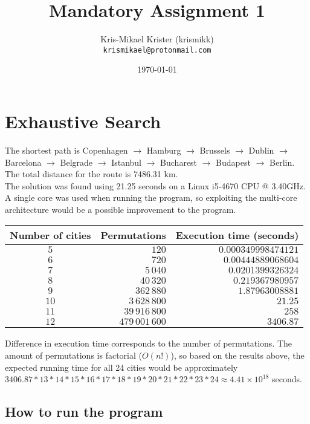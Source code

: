 \documentclass{article}
\title{Mandatory Assignment 1}
\author{Kris-Mikael Krister (krismikk)\\\texttt{krismikael@protonmail.com}}
\date{\today}
\begin{document}
\maketitle
\section*{Exhaustive Search}

The shortest path is Copenhagen $\rightarrow$ Hamburg $\rightarrow$ Brussels $\rightarrow$ Dublin $\rightarrow$ Barcelona $\rightarrow$ Belgrade $\rightarrow$ Istanbul $\rightarrow$ Bucharest $\rightarrow$ Budapest $\rightarrow$ Berlin. The total distance for the route is 7486.31 km.\\

\noindent The solution was found using 21.25 seconds on a Linux i5-4670 CPU @ 3.40GHz. A single core was used when running the program, so exploiting the multi-core architecture would be a possible improvement to the program.\\

\begin{center}
\begin{tabular}{crr}
\toprule
Number of cities & Permutations & Execution time (seconds) \\
\midrule
$5$ & $120$ & $0.000349998474121$ \\
$6$ & $720$ & $0.00444889068604$ \\
$7$ & $5\,040$ & $0.0201399326324$ \\
$8$ & $40\,320$ & $0.219367980957$ \\
$9$ & $362\,880$ & $1.87963008881$ \\
$10$ & $3\,628\,800$ & $21.25$ \\
$11$ & $39\,916\,800$ & $258$ \\
$12$ & $479\,001\,600$ & $3406.87$ \\
\bottomrule
\end{tabular}
\end{center}

\noindent Difference in execution time corresponds to the number of permutations. The amount of permutations is factorial ($O(n!)$), so based on the results above, the expected running time for all 24 cities would be approximately $3406.87 * 13 * 14 * 15 * 16 * 17 * 18 * 19 * 20 * 21 * 22 * 23 * 24 \approx 4.41 \times 10^{18}$ seconds.

\subsection*{How to run the program}
\end{document}
